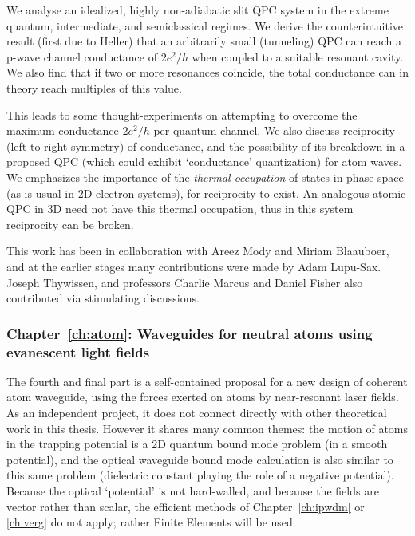 We analyse an idealized, highly non-adiabatic slit QPC system
in the extreme quantum, intermediate, and semiclassical regimes.
We derive the
counterintuitive result (first due to Heller) that an 
arbitrarily small (tunneling) QPC can reach a p-wave channel conductance
of $2e^2/h$
when coupled to a suitable resonant cavity.
We also find that if two or more resonances coincide, the
total conductance can in theory reach multiples of this value.

This leads to some thought-experiments on attempting to overcome the maximum
conductance $2e^2/h$ per quantum channel.
We also discuss reciprocity (left-to-right symmetry)
of conductance, and the possibility
of its breakdown in a proposed QPC
(which could exhibit `conductance' quantization) for atom waves\cite{josephqpc}.
We emphasizes the importance of the {\em thermal occupation} of states in
phase space (as is usual in 2D electron systems), for reciprocity to exist.
An analogous atomic QPC in 3D need not have this thermal occupation,
thus in this system reciprocity can be broken.

This work has been in collaboration with Areez Mody and Miriam Blaauboer,
and at the earlier stages many contributions were made by Adam Lupu-Sax.
Joseph Thywissen, and professors Charlie Marcus and Daniel Fisher
also contributed via stimulating discussions.







\subsubsection{Chapter~\ref{ch:atom}: Waveguides for neutral atoms using
evanescent light fields}

The fourth and final part is a self-contained proposal for a new
design of coherent
atom waveguide, using the forces exerted on atoms by near-resonant
laser fields.
As an independent project, it
does not connect directly with other theoretical work in this thesis.
However it shares many common themes:
the motion of atoms in the trapping potential is a 2D quantum bound mode
problem (in a smooth potential), and
the optical waveguide
bound mode calculation
is also similar to this same problem
(dielectric constant playing the role of a negative potential).
Because the optical `potential' is not hard-walled, and because the fields
are vector rather than scalar,
the efficient methods of Chapter~\ref{ch:ipwdm} or \ref{ch:verg}
do not apply; rather Finite Elements\cite{FEreview} will be used.

